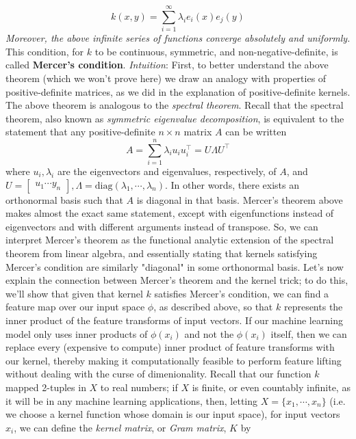 \documentclass{article}
\begin{document}
$$ k(x, y) = \sum_{i = 1}^\infty \lambda_i e_i(x) e_j(y) $$
\indent \textit{Moreover, the above infinite series of functions converge absolutely and uniformly.
}\newline
This condition, for $ k $ to be continuous, symmetric, and non-negative-definite, is called \textbf{Mercer's condition}.
\newline
\indent \textit{Intuition}: First, to better understand the above theorem (which we won't prove here) we draw an analogy with properties of positive-definite matrices, as we did in the explanation of positive-definite kernels. The above theorem is analogous to the \textit{spectral theorem}. Recall that the spectral theorem, also known as \textit{symmetric eigenvalue decomposition}, is equivalent to the statement that any positive-definite $ n \times n $ matrix $ A $ can be written
$$ A = \sum_{i = 1}^n \lambda_i u_i u_i^\intercal = U \Lambda U^\intercal $$
where $ u_i, \lambda_i $ are the eigenvectors and eigenvalues, respectively, of $ A $, and $ U = \begin{bmatrix} u_1 \cdots y_n \end{bmatrix}, \Lambda = \text{diag}(\lambda_1, \cdots, \lambda_n) $. In other words, there exists an orthonormal basis such that $ A $ is diagonal in that basis. Mercer's theorem above makes almost the exact same statement, except with eigenfunctions instead of eigenvectors and with different arguments instead of transpose. So, we can interpret Mercer's theorem as the functional analytic extension of the spectral theorem from linear algebra, and essentially stating that kernels satisfying Mercer's condition are similarly "diagonal" in some orthonormal basis.
\newline \newline
Let's now explain the connection between Mercer's theorem and the kernel trick; to do this, we'll show that given that kernel $ k $ satisfies Mercer's condition, we can find a feature map over our input space $ \phi $, as described above, so that $ k $ represents the inner product of the feature transforms of input vectors. If our machine learning model only uses inner products of $ \phi(x_i) $ and not the $ \phi(x_i) $ itself, then we can replace every (expensive to compute) inner product of feature transforms with our kernel, thereby making it computationally feasible to perform feature lifting without dealing with the curse of dimenionality.
\newline
Recall that our function $ k $ mapped 2-tuples in $ X $ to real numbers; if $ X $ is finite, or even countably infinite, as it will be in any machine learning applications, then, letting $ X = \{ x_1, \cdots, x_n \} $ (i.e. we choose a kernel function whose domain is our input space), for input vectors $ x_i $, we can define the \textit{kernel matrix}, or \textit{Gram matrix}, $ K $ by
\end{document}
